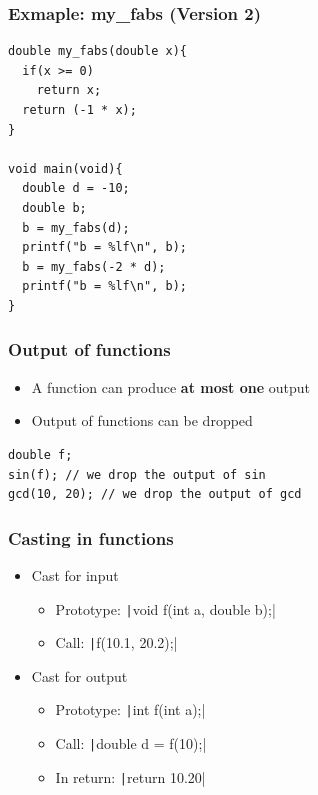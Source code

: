 \documentclass{../c-lecture}
\begin{document}
\begin{frame}[fragile]
  \frametitle{Exmaple: my\_fabs (Version 2)}
  \scriptsize
  \begin{verbatim}
double my_fabs(double x){
  if(x >= 0)
    return x;
  return (-1 * x);
}

void main(void){
  double d = -10;
  double b;
  b = my_fabs(d);
  printf("b = %lf\n", b);
  b = my_fabs(-2 * d);
  printf("b = %lf\n", b);
}
  \end{verbatim}
\end{frame}

\begin{frame}[fragile]
  \frametitle{Output of functions}
  \begin{itemize}
    \item
      A function can produce
      \textbf{\color{YellowOrange} at most one} output

    \item Output of functions can be dropped
  \end{itemize}
  \begin{verbatim}
double f;
sin(f); // we drop the output of sin
gcd(10, 20); // we drop the output of gcd
  \end{verbatim}
\end{frame}

\begin{frame}[fragile]
  \frametitle{Casting in functions}
  \begin{itemize}
    \item Cast for input
    \begin{itemize}
      \item
        Prototype: \texttt|void f(int a, double b);|
      \item Call: \texttt|f(10.1, 20.2);|
    \end{itemize}
    \item Cast for output
    \begin{itemize}
      \item Prototype: \texttt|int f(int a);|
      \item Call: \texttt|double d = f(10);|
      \item In return: \texttt|return 10.20|
    \end{itemize}
  \end{itemize}
\end{frame}
\end{document}
